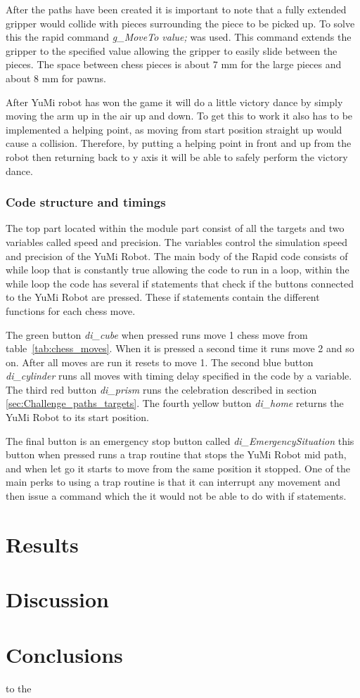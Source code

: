 \documentclass[a4paper,12pt]{article}
\begin{document}
After the paths have been created it is important to note that a fully extended gripper would collide with pieces surrounding the piece to be picked up. To solve this the rapid command \textit{g\_MoveTo value;} was used. This command extends the gripper to the specified value allowing the gripper to easily slide between the pieces. The space between chess pieces is about 7 mm for the large pieces and about 8 mm for pawns.

After YuMi robot has won the game it will do a little victory dance by simply moving the arm up in the air up and down. To get this to work it also has to be implemented a helping point, as moving from start position straight up would cause a collision. Therefore, by putting a helping point in front and up from the robot then returning back to y axis it will be able to safely perform the victory dance. 

\subsubsection{Code structure and timings}
The top part located within the module part consist of all the targets and two variables called speed and precision. The variables control the simulation speed and precision of the YuMi Robot. The main body of the Rapid code consists of while loop that is constantly true allowing the code to run in a loop, within the while loop the code has several if statements that check if the buttons connected to the YuMi Robot are pressed. These if statements contain the different functions for each chess move.

The green button \textit{di\_cube} when pressed runs move 1 chess move from table~\ref{tab:chess_moves}. When it is pressed a second time it runs move 2 and so on. After all moves are run it resets to move 1. The second blue button \textit{di\_cylinder} runs all moves with timing delay specified in the code by a variable. The third red button \textit{di\_prism} runs the celebration described in section \ref{sec:Challenge_paths_targets}. The fourth yellow button \textit{di\_home} returns the YuMi Robot to its start position.

The final button is an emergency stop button called \textit{di\_EmergencySituation} this button when pressed runs a trap routine that stops the YuMi Robot mid path, and when let go it starts to move from the same position it stopped. One of the main perks to using a trap routine is that it can interrupt any movement and then issue a command which the it would not be able to do with if statements.


\section{Results}
\section{Discussion}
\section{Conclusions} to the
\end{document}
